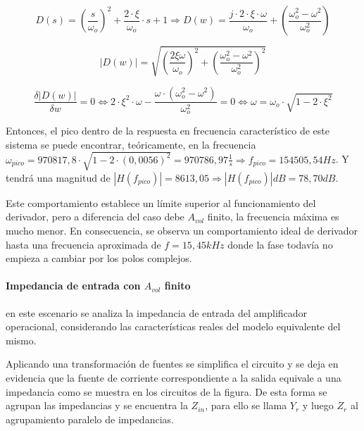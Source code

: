 \begin{equation*}
	D(s) = \left( \frac{s}{\omega_o} \right)^{2} + \frac{2 \cdot \xi}{\omega_o} \cdot s + 1
	\Rightarrow
	D(w) = \frac{j \cdot 2 \cdot \xi \cdot \omega}{\omega_o} + \left( \frac{\omega_o^{2} - \omega^{2}}{\omega_o^{2}} \right)
\end{equation*}

\begin{equation*}
	|D(w)| = \sqrt{\left( \frac{2 \xi \omega}{\omega_o} \right)^{2} + \left( \frac{\omega_o^{2} - \omega^{2}}{\omega_o^{2}} \right)^{2}}
\end{equation*}

\begin{equation}
	\frac{\delta |D(w)|}{\delta w}
	= 0 \Leftrightarrow 2 \cdot \xi^{2} \cdot \omega - \frac{\omega \cdot (\omega_o^{2} - \omega^{2})}{\omega_o^{2}} = 0
	\Leftrightarrow
	\omega = \omega_o \cdot \sqrt{1 - 2 \cdot \xi^{2}}
\end{equation}

Entonces, el pico dentro de la respuesta en frecuencia caracter\'istico de este sistema se puede encontrar, te\'oricamente, en la frecuencia $\omega_{pico} = 970817,8 \cdot \sqrt{1- 2 \cdot (0,0056)^{2}} = 970786,97 \frac{1}{s} \Rightarrow f_{pico} = 154505,54Hz$. Y tendr\'a una magnitud de $|H(f_{pico})| = 8613,05 \Rightarrow |H(f_{pico})|dB = 78,70dB$.

Este comportamiento establece un l\'imite superior al funcionamiento del derivador, pero a diferencia del caso debe
$A_{vol}$ finito, la frecuencia m\'axima es mucho menor. En consecuencia, se observa un comportamiento ideal de derivador hasta
una frecuencia aproximada de $f = 15,45kHz$ donde la fase todav\'ia no empieza a cambiar por los polos complejos.


\paragraph*{Impedancia de entrada con $A_{vol}$ finito} en este escenario se analiza la impedancia de entrada del amplificador operacional, considerando las caracter\'isticas reales del modelo equivalente del mismo.

Aplicando una transformaci\'on de fuentes se simplifica el circuito y se deja en evidencia que la fuente de corriente correspondiente a la salida equivale a una impedancia como se muestra en los circuitos de la figura. %
De esta forma se agrupan las impedancias y se encuentra la $Z_{in}$, para ello se llama $Y_r$ y luego $Z_r$ al agrupamiento paralelo de impedancias.

